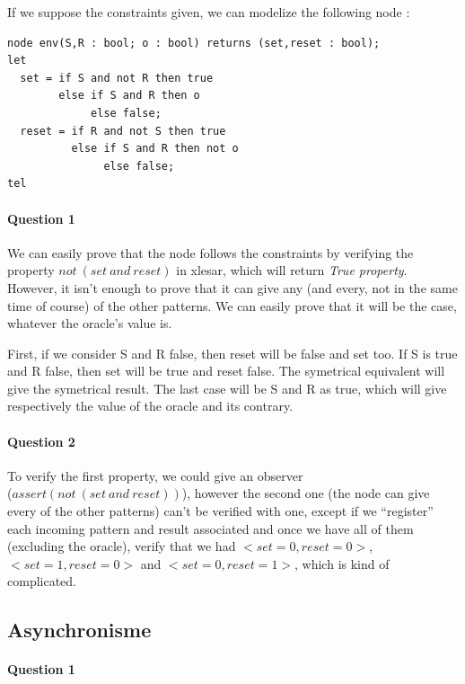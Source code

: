 \documentclass{article}
\begin{document}
If we suppose the constraints given, we can modelize the following node :

\begin{verbatim}
node env(S,R : bool; o : bool) returns (set,reset : bool);
let
  set = if S and not R then true
        else if S and R then o
             else false;
  reset = if R and not S then true
          else if S and R then not o
               else false;
tel
\end{verbatim}

\paragraph{Question 1} 

We can easily prove that the node follows the constraints
by verifying the property $not~(set~ and~ reset)$ in xlesar, which will return
\emph{True property}. However, it isn't enough to prove that it can give any
(and every, not in the same time of course) of the other patterns. We can easily
prove that it will be the case, whatever the oracle's value is.

First, if we consider S and R false, then reset will be false and set too. If
S is true and R false, then set will be true and reset false. The symetrical
equivalent will give the symetrical result. The last case will be S and R as
true, which will give respectively the value of the oracle and its contrary.

\paragraph{Question 2} 

To verify the first property, we could give an observer \\
 ($assert(not~(set~ and~reset))$), however the second one (the node can give every of the other
patterns) can't be verified with one, except if we ``register'' each incoming
pattern and result associated  and once we have all of them (excluding the
oracle), verify that we had $<set=0, reset=0>$, $<set=1, reset=0>$ and $<set=0,
reset=1>$, which is kind of complicated.

\subsection{Asynchronisme}

\paragraph{Question 1}
\end{document}
